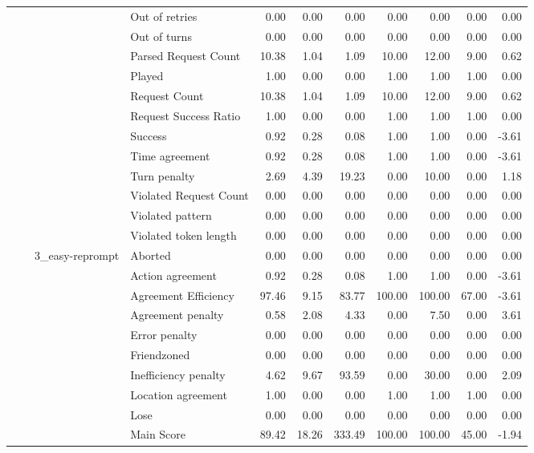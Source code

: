 \begin{tabular}{llllrrrrrrr}
 &  &  & Out of retries & 0.00 & 0.00 & 0.00 & 0.00 & 0.00 & 0.00 & 0.00 \\
 &  &  & Out of turns & 0.00 & 0.00 & 0.00 & 0.00 & 0.00 & 0.00 & 0.00 \\
 &  &  & Parsed Request Count & 10.38 & 1.04 & 1.09 & 10.00 & 12.00 & 9.00 & 0.62 \\
 &  &  & Played & 1.00 & 0.00 & 0.00 & 1.00 & 1.00 & 1.00 & 0.00 \\
 &  &  & Request Count & 10.38 & 1.04 & 1.09 & 10.00 & 12.00 & 9.00 & 0.62 \\
 &  &  & Request Success Ratio & 1.00 & 0.00 & 0.00 & 1.00 & 1.00 & 1.00 & 0.00 \\
 &  &  & Success & 0.92 & 0.28 & 0.08 & 1.00 & 1.00 & 0.00 & -3.61 \\
 &  &  & Time agreement & 0.92 & 0.28 & 0.08 & 1.00 & 1.00 & 0.00 & -3.61 \\
 &  &  & Turn penalty & 2.69 & 4.39 & 19.23 & 0.00 & 10.00 & 0.00 & 1.18 \\
 &  &  & Violated Request Count & 0.00 & 0.00 & 0.00 & 0.00 & 0.00 & 0.00 & 0.00 \\
 &  &  & Violated pattern & 0.00 & 0.00 & 0.00 & 0.00 & 0.00 & 0.00 & 0.00 \\
 &  &  & Violated token length & 0.00 & 0.00 & 0.00 & 0.00 & 0.00 & 0.00 & 0.00 \\
\cline{3-11}
 &  & \multirow[t]{27}{*}{3_easy-reprompt} & Aborted & 0.00 & 0.00 & 0.00 & 0.00 & 0.00 & 0.00 & 0.00 \\
 &  &  & Action agreement & 0.92 & 0.28 & 0.08 & 1.00 & 1.00 & 0.00 & -3.61 \\
 &  &  & Agreement Efficiency & 97.46 & 9.15 & 83.77 & 100.00 & 100.00 & 67.00 & -3.61 \\
 &  &  & Agreement penalty & 0.58 & 2.08 & 4.33 & 0.00 & 7.50 & 0.00 & 3.61 \\
 &  &  & Error penalty & 0.00 & 0.00 & 0.00 & 0.00 & 0.00 & 0.00 & 0.00 \\
 &  &  & Friendzoned & 0.00 & 0.00 & 0.00 & 0.00 & 0.00 & 0.00 & 0.00 \\
 &  &  & Inefficiency penalty & 4.62 & 9.67 & 93.59 & 0.00 & 30.00 & 0.00 & 2.09 \\
 &  &  & Location agreement & 1.00 & 0.00 & 0.00 & 1.00 & 1.00 & 1.00 & 0.00 \\
 &  &  & Lose & 0.00 & 0.00 & 0.00 & 0.00 & 0.00 & 0.00 & 0.00 \\
 &  &  & Main Score & 89.42 & 18.26 & 333.49 & 100.00 & 100.00 & 45.00 & -1.94 \\

\end{tabular}
